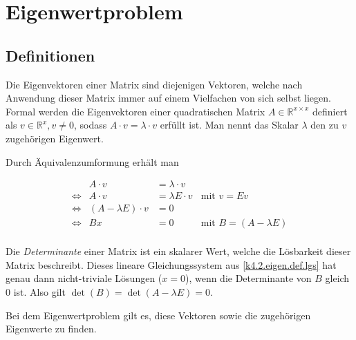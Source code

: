 \documentclass[]{dsadokumentation}
\begin{document}
\tableofcontents


\section{Eigenwertproblem}

\subsection{Definitionen}\label{k4.2.eigen.def}

Die Eigenvektoren einer Matrix sind diejenigen Vektoren, welche nach Anwendung dieser Matrix immer auf einem Vielfachen von sich selbst liegen.
Formal werden die Eigenvektoren einer quadratischen Matrix $A \in \mathbb{R}^{x \times x}$ definiert als $v \in \mathbb{R}^{x}, v \neq 0$, sodass $A \cdot v = \lambda \cdot v$ erfüllt ist. Man nennt das Skalar $\lambda$ den zu $v$ zugehörigen Eigenwert.

Durch Äquivalenzumformung erhält man

\begin{equation}
  \label{k4.2.eigen.def.lgs}
  \begin{aligned}
     &                 & A \cdot v               & = \lambda \cdot v   &                                 & \\
     & \Leftrightarrow & A \cdot v               & = \lambda E \cdot v & \text{mit } v = Ev              & \\
     & \Leftrightarrow & (A - \lambda E) \cdot v & = 0                 &                                 & \\
     & \Leftrightarrow & Bx                      & = 0  \quad \quad    & \text{mit } B = (A - \lambda E) & \\
  \end{aligned}
\end{equation}

Die \textit{Determinante} einer Matrix ist ein skalarer Wert, welche die Lösbarkeit dieser Matrix beschreibt. Dieses lineare Gleichungssystem aus \cref{k4.2.eigen.def.lgs} hat genau dann nicht-triviale Lösungen ($x = 0$), wenn die Determinante von $B$ gleich $0$ ist. Also gilt $\det (B) = \det (A - \lambda E) = 0$.

Bei dem Eigenwertproblem gilt es, diese Vektoren sowie die zugehörigen Eigenwerte zu finden.
\end{document}
